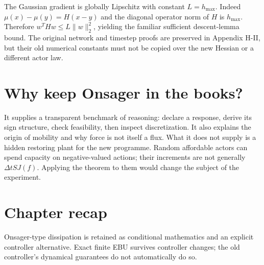 The Gaussian gradient is globally Lipschitz with constant
$L=h_{\max}$. Indeed $\mu(x)-\mu(y)=H(x-y)$ and the diagonal operator
norm of $H$ is $h_{\max}$. Therefore
$w^THw\leq L\|w\|_2^2$, yielding the familiar sufficient descent-lemma
bound. The original network and timestep proofs are preserved in Appendix
H-II, but their old numerical constants must not be copied over the new
Hessian or a different actor law.

\section{Why keep Onsager in the books?}
It supplies a transparent benchmark of reasoning: declare a response,
derive its sign structure, check feasibility, then inspect discretization.
It also explains the origin of mobility and why force is not itself a flux.
What it does not supply is a hidden restoring plant for the new programme.
Random affordable actors can spend capacity on negative-valued actions;
their increments are not generally $\Delta t SJ(f)$. Applying the theorem
to them would change the subject of the experiment.

\section*{Chapter recap}
Onsager-type dissipation is retained as conditional mathematics and an
explicit controller alternative. Exact finite EBU survives controller
changes; the old controller's dynamical guarantees do not automatically do so.
